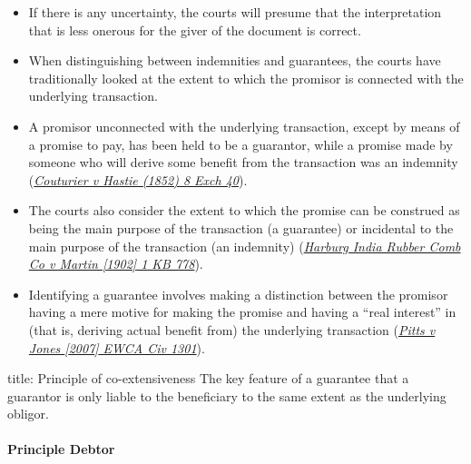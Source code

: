 \documentclass[
]{article}
\newenvironment{Shaded}{}{}
\newcommand{\NormalTok}[1]{#1}
\providecommand{\tightlist}{%
  \setlength{\itemsep}{0pt}\setlength{\parskip}{0pt}}
\begin{document}
\begin{itemize}
\tightlist
\item
  If there is any uncertainty, the courts will presume that the
  interpretation that is less onerous for the giver of the document is
  correct.
\item
  When distinguishing between indemnities and guarantees, the courts
  have traditionally looked at the extent to which the promisor is
  connected with the underlying transaction.
\item
  A promisor unconnected with the underlying transaction, except by
  means of a promise to pay, has been held to be a guarantor, while a
  promise made by someone who will derive some benefit from the
  transaction was an indemnity
  (\emph{\href{https://uk.westlaw.com/D-000-4146?originationContext=document\&transitionType=PLDocumentLink\&contextData=(sc.Default)\&ppcid=31b1b10b11a346b28acbfa5d800fec19}{Couturier
  v Hastie (1852) 8 Exch 40}}).
\item
  The courts also consider the extent to which the promise can be
  construed as being the main purpose of the transaction (a guarantee)
  or incidental to the main purpose of the transaction (an indemnity)
  (\emph{\href{https://uk.westlaw.com/D-000-5044?originationContext=document\&transitionType=PLDocumentLink\&contextData=(sc.Default)\&ppcid=31b1b10b11a346b28acbfa5d800fec19}{Harburg
  India Rubber Comb Co v Martin {[}1902{]} 1 KB 778}}).
\item
  Identifying a guarantee involves making a distinction between the
  promisor having a mere motive for making the promise and having a
  ``real interest'' in (that is, deriving actual benefit from) the
  underlying transaction
  (\emph{\href{https://uk.westlaw.com/D-000-2980?originationContext=document\&transitionType=PLDocumentLink\&contextData=(sc.Default)\&ppcid=31b1b10b11a346b28acbfa5d800fec19}{Pitts
  v Jones {[}2007{]} EWCA Civ 1301}}).
\end{itemize}

\begin{Shaded}
\begin{Highlighting}[]
\NormalTok{title: Principle of co{-}extensiveness}
\NormalTok{The key feature of a guarantee that a guarantor is only liable to the beneficiary to the same extent as the underlying obligor.}
\end{Highlighting}
\end{Shaded}

\hypertarget{principle-debtor}{%
\paragraph{Principle Debtor}\label{principle-debtor}}
\end{document}
